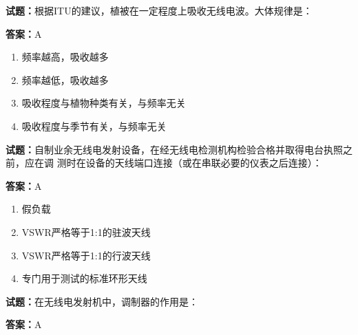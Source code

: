 \documentclass{ctexbook}
\begin{document}




\vspace{1em}

\textbf{试题：}根据ITU的建议，植被在一定程度上吸收无线电波。大体规律是： 

\textbf{答案：}A 

\begin{enumerate}[leftmargin=3em]
  \item 频率越高，吸收越多 

  \item 频率越低，吸收越多 

  \item 吸收程度与植物种类有关，与频率无关 

  \item 吸收程度与季节有关，与频率无关 

\end{enumerate}





\vspace{1em}

\textbf{试题：}自制业余无线电发射设备，在经无线电检测机构检验合格并取得电台执照之前，应在调
测时在设备的天线端口连接（或在串联必要的仪表之后连接）： 

\textbf{答案：}A 

\begin{enumerate}[leftmargin=3em]
  \item 假负载 

  \item VSWR严格等于1:1的驻波天线 

  \item VSWR严格等于1:1的行波天线 

  \item 专门用于测试的标准环形天线 

\end{enumerate}





\vspace{1em}

\textbf{试题：}在无线电发射机中，调制器的作用是： 

\textbf{答案：}A 
\end{document}
